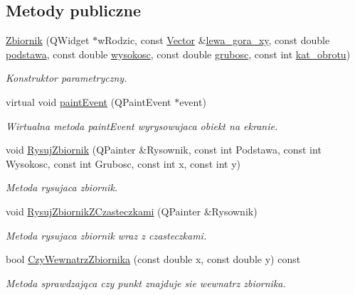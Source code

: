 \subsection*{Metody publiczne}
\begin{DoxyCompactItemize}
\item 
\hyperlink{class_zbiornik_a11d5608bafb33c6bdb0b9710492b1554}{Zbiornik} (Q\-Widget $\ast$w\-Rodzic, const \hyperlink{class_vector}{Vector} \&\hyperlink{class_zbiornik_a811829ed13289d4fad56ae5fcd92bec8}{lewa\-\_\-gora\-\_\-xy}, const double \hyperlink{class_zbiornik_ac64f411a313024c52dbc1c18897df573}{podstawa}, const double \hyperlink{class_zbiornik_a72ab0eb9f3562de0ea90e176f515be42}{wysokosc}, const double \hyperlink{class_zbiornik_a34b0e660d8d6c4d1f45f06f5063b9788}{grubosc}, const int \hyperlink{class_zbiornik_ab0a2ae2523139dadc52a9499a6c2ab98}{kat\-\_\-obrotu})
\begin{DoxyCompactList}\small\item\em Konstruktor parametryczny. \end{DoxyCompactList}\item 
virtual void \hyperlink{class_zbiornik_af7a9c185e95b92de342c6dc69f020765}{paint\-Event} (Q\-Paint\-Event $\ast$event)
\begin{DoxyCompactList}\small\item\em Wirtualna metoda paint\-Event wyrysowujaca obiekt na ekranie. \end{DoxyCompactList}\item 
void \hyperlink{class_zbiornik_ad15f40d418d9ebf261de0eabe8cc2906}{Rysuj\-Zbiornik} (Q\-Painter \&Rysownik, const int Podstawa, const int Wysokosc, const int Grubosc, const int x, const int y)
\begin{DoxyCompactList}\small\item\em Metoda rysujaca zbiornik. \end{DoxyCompactList}\item 
void \hyperlink{class_zbiornik_af831a2751191eab54fb6438392ac6edb}{Rysuj\-Zbiornik\-Z\-Czasteczkami} (Q\-Painter \&Rysownik)
\begin{DoxyCompactList}\small\item\em Metoda rysujaca zbiornik wraz z czasteczkami. \end{DoxyCompactList}\item 
bool \hyperlink{class_zbiornik_a60fd88e85e8696cfec92cd24609e7410}{Czy\-Wewnatrz\-Zbiornika} (const double x, const double y) const 
\begin{DoxyCompactList}\small\item\em Metoda sprawdzająca czy punkt znajduje sie wewnatrz zbiornika. \end{DoxyCompactList}\item 

\end{DoxyCompactItemize}
